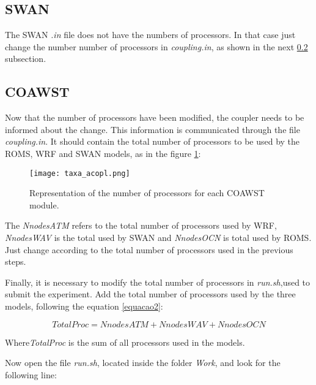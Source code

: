 \subsection{SWAN}

\bigskip The SWAN \textit{.in} file does not have the numbers of processors. In that case just change the number
number of processors in \textit{coupling.in}, as shown in the next \textcolor{bleu_cite}{\ref{coawstproc}} subsection.
\bigskip

\subsection{COAWST}\label{coawstproc}
\bigskip

\noindent Now that the number of processors have been modified, the coupler needs to be informed about the change. 
This information is communicated through the file \textit{coupling.in}. It should contain the total number of processors 
to be used by the ROMS, WRF and SWAN models, as in the figure \textcolor{bleu_cite}{\ref{procscoa}}:
\bigskip

\begin{figure}[H]
    \centering
    \texttt{[image: taxa\_acopl.png]}
    \caption{Representation of the number of processors for each COAWST module.}
    \label{procscoa}
\end{figure}
\bigskip

\noindent The \textit{NnodesATM} refers to the total number of processors used by WRF, \textit{NnodesWAV} is the
total used by SWAN and \textit{NnodesOCN} is total used by ROMS. Just change according to the total number of processors used
in the previous steps.
\bigskip

\noindent Finally, it is necessary to modify the total number of processors in \textit{run.sh},used to submit the experiment.
Add the total number of processors used by the three models, following the equation \textcolor{bleu_cite}{\ref{equacao2}}:
\bigskip

\begin{equation}
TotalProc = NnodesATM + NnodesWAV + NnodesOCN
\label{equacao2}
\end{equation}
\bigskip

\noindent Where\textit{TotalProc} is the sum of all processors used in the models.
\bigskip

\noindent Now open the file \textit{run.sh}, located inside the folder \textit{Work}, and look for the following line:
\bigskip

